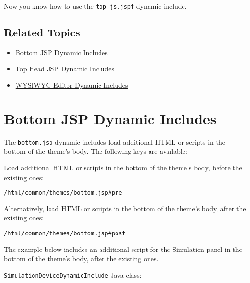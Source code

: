 Now you know how to use the \texttt{top\_js.jspf} dynamic include.

\section{Related Topics}\label{related-topics-22}

\begin{itemize}
\tightlist
\item
  \href{/docs/7-2/customization/-/knowledge_base/c/bottom-jsp-dynamic-includes}{Bottom
  JSP Dynamic Includes}
\item
  \href{/docs/7-2/customization/-/knowledge_base/c/top-head-jsp-dynamic-includes}{Top
  Head JSP Dynamic Includes}
\item
  \href{/docs/7-2/customization/-/knowledge_base/c/wysiwyg-editor-dynamic-includes}{WYSIWYG
  Editor Dynamic Includes}
\end{itemize}

\chapter{Bottom JSP Dynamic Includes}\label{bottom-jsp-dynamic-includes}

The \texttt{bottom.jsp} dynamic includes load additional HTML or scripts
in the bottom of the theme's body. The following keys are available:

Load additional HTML or scripts in the bottom of the theme's body,
before the existing ones:

\begin{verbatim}
/html/common/themes/bottom.jsp#pre
\end{verbatim}

Alternatively, load HTML or scripts in the bottom of the theme's body,
after the existing ones:

\begin{verbatim}
/html/common/themes/bottom.jsp#post 
\end{verbatim}

The example below includes an additional script for the Simulation panel
in the bottom of the theme's body, after the existing ones.

\texttt{SimulationDeviceDynamicInclude} Java class:

